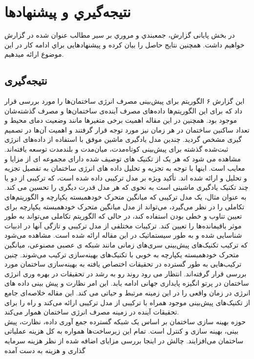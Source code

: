\chapter{نتيجه‌گيري و پیشنهادها}
در بخش پایانی گزارش، جمعبندي و مروري بر سیر مطالب عنوان شده در گزارش خواهیم داشت. همچنین نتایج حاصل را بیان
کرده و پیشنهادهایی براي ادامه کار در این موضوع ارائه میدهیم.
\section{نتیجه‌گیری}
این گزارش ۶ الگوریتم‌ برای پیش‌بینی مصرف انرژی ساختمان‌ها را مورد بررسی قرار داد که برای این الگوریتم‌ها داده‌های مصرف آینده‌ی ساختمان‌ها و مصرف گذشته‌شان موجود بود. 
همچنین در این مقاله اهمیت برخی متغیرها مانند وضعیت دمای محیط و تعداد ساکنین ساختمان در هر زمان نیز مورد توجه قرار گرفتند و اهمیت آن‌ها در تصمیم گیری مشخص گردید.
چندین مدل یادگیری ماشین موفق با استفاده از داده‌های انرژی ثبت‌شده گذشته برای پیش‌بینی کوتاه‌مدت، میان‌مدت و بلندمدت توسعه یافته‌اند. مشاهده می شود 
که هر یک از تکنیک های توصیف شده دارای مجموعه ای از مزایا و معایب است. اینها با توجه به تجزیه و تحلیل داده های انرژی ساختمان به تفصیل تجزیه و تحلیل و ارائه شده اند.
 تأکید ویژه بر مدل ترکیبی داده شده است، که ترکیبی از دو یا چند تکنیک یادگیری ماشینی است به نحوی که هر مدل قدرت دیگری 
 را تحسین می کند. به عنوان مثال، یک مدل ترکیبی که میانگین متحرک خودهمبسته یکپارچه و الگوریتم‌های تکاملی را در نظر می‌گیرد، می‌تواند
  از مدل میانگین متحرک خودهمبسته یکپارچه برای تعیین تناوب و خطی بودن استفاده کند، در حالی که الگوریتم‌ تکاملی می‌تواند به طور موثر باقیمانده‌ها را تعیین کند. ترکیبات مختلفی از مدل ترکیبی و تازگی آنها در
   ادبیات شناسایی شده و به طور سیستماتیک در این مقاله ارائه شده است. مشاهده می‌شود
   که ترکیب تکنیک‌های پیش‌بینی سری‌های زمانی مانند شبکه ی عصبی مصنوعی، میانگین متحرک خودهمبسته یکپارچه به خوبی با 
   تکنیک‌های بهینه‌سازی ترکیب می‌شوند. چنین ترکیب‌هایی به طور گسترده در تحقیقات اختصاص یافته به بهینه‌سازی ساختمان مورد بررسی قرار گرفته‌اند.
    انتظار می رود روند رو به رشد
    در تحقیقات در بهره وری انرژی ساختمان در پرتو انگیزه پایداری جهانی ادامه یابد. این امر نظارت و پیش بینی داده های انرژی در 
    زمان واقعی را در این زمینه مرتبط و حیاتی می کند. این مقاله خلاصه‌ای جامع از تکنیک‌های پیش‌بینی موجود همراه با ترکیبی
     از مدل ترکیبی ارائه می‌کند و راه را برای تحقیقات آینده در زمینه مصرف انرژی ساختمان هموار می‌کند.
     \\
     حوزه بهینه سازی ساختمان بر اساس یک شبکه گسترده جمع آوری داده، نظارت، پیش بینی، بهینه سازی و کنترل است. تمام این زیرساخت‌ها
      همواره به کل هزینه عملیاتی ساختمان می‌افزایند. چالش در اینجا بررسی مزایای اضافه شده از نظر هزینه سرمایه گذاری و هزینه به دست آمده
